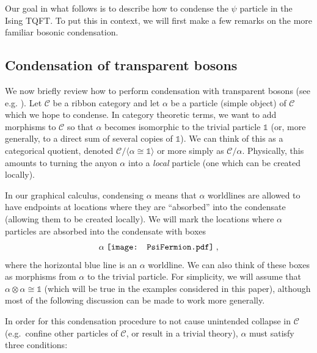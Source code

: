 \documentclass[12pt,a4paper]{article}
\newcommand{\unit}{\mathds{1}}
\newcommand{\mcc}{\mathcal{C}}
\newcommand{\PsiFermion}{\mathord{\vcenter{\hbox{\texttt{[image: PsiFermion.pdf]}}}}}
\begin{document}
Our goal in what follows is to describe how to condense the $\psi$ particle in the Ising TQFT. 
To put this in context, we will first make a few remarks on the more familiar bosonic condensation. 






\subsection{Condensation of transparent bosons}\label{general_condensation}

We now briefly review how to perform condensation with transparent bosons (see e.g. \cite{eliens2014diagrammatics}).  
Let $\mcc$ be a ribbon category and let $\alpha$ be a particle (simple object) of $\mcc$ which we hope to condense.
In category theoretic terms, we want to add morphisms to $\mcc$ so that $\alpha$ becomes
isomorphic to the trivial particle $\unit$ (or, more generally, to a direct sum of several copies of $\unit$). 
We can think of this as a categorical quotient, denoted $\mcc/\langle \alpha \cong \unit \rangle$ or
more simply as $\mcc/\alpha$.
Physically, this amounts to turning the anyon $\alpha$ into a {\it local} particle (one which 
can be created locally).

In our graphical calculus, condensing $\alpha$ means that $\alpha$ worldlines are allowed to 
have endpoints at locations where they are ``absorbed'' into the condensate (allowing them 
to be created locally).
We will mark the locations where $\alpha$ particles are absorbed into the condensate with boxes
\begin{align}
\label{box_def}
\alpha\; \PsiFermion\; , 
\end{align}
where the horizontal blue line is an $\alpha$ worldline. 
We can also think of these boxes as morphisms from $\alpha$ to the trivial particle.
For simplicity, we will assume that $\alpha\otimes\alpha\cong \unit$ (which will be true in the examples considered in this paper), 
although most of the following discussion can be made to work more generally.

In order for this condensation procedure to not cause unintended collapse 
in $\mcc$ (e.g.\ confine other particles of $\mcc$, or result in a trivial theory),
$\alpha$ must satisfy three conditions:
\end{document}
